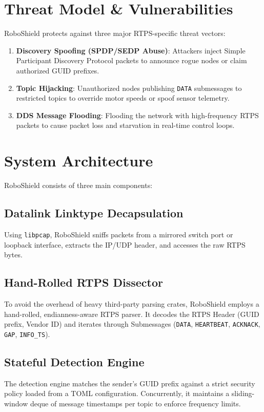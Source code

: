 \documentclass[letterpaper, 10 pt, conference]{ieeeconf}
\begin{document}
\section{Threat Model \& Vulnerabilities}
RoboShield protects against three major RTPS-specific threat vectors:
\begin{enumerate}
    \item \textbf{Discovery Spoofing (SPDP/SEDP Abuse)}: Attackers inject Simple Participant Discovery Protocol packets to announce rogue nodes or claim authorized GUID prefixes.
    \item \textbf{Topic Hijacking}: Unauthorized nodes publishing \texttt{DATA} submessages to restricted topics to override motor speeds or spoof sensor telemetry.
    \item \textbf{DDS Message Flooding}: Flooding the network with high-frequency RTPS packets to cause packet loss and starvation in real-time control loops.
\end{enumerate}

\section{System Architecture}
RoboShield consists of three main components:
\subsection{Datalink Linktype Decapsulation}
Using \texttt{libpcap}, RoboShield sniffs packets from a mirrored switch port or loopback interface, extracts the IP/UDP header, and accesses the raw RTPS bytes.
\subsection{Hand-Rolled RTPS Dissector}
To avoid the overhead of heavy third-party parsing crates, RoboShield employs a hand-rolled, endianness-aware RTPS parser. It decodes the RTPS Header (GUID prefix, Vendor ID) and iterates through Submessages (\texttt{DATA}, \texttt{HEARTBEAT}, \texttt{ACKNACK}, \texttt{GAP}, \texttt{INFO\_TS}).
\subsection{Stateful Detection Engine}
The detection engine matches the sender's GUID prefix against a strict security policy loaded from a TOML configuration. Concurrently, it maintains a sliding-window deque of message timestamps per topic to enforce frequency limits.
\end{document}
